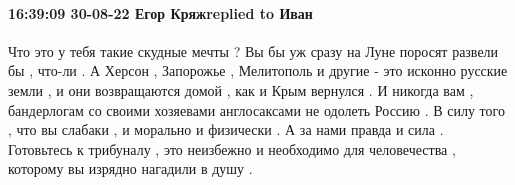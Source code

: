  
 
 
 
 

\paragraph{16:39:09 30-08-22 Егор Кряжreplied to Иван}

Что это у тебя такие скудные мечты ? Вы бы уж сразу на Луне поросят развели бы
, что-ли . А Херсон , Запорожье , Мелитополь и другие - это исконно русские
земли , и они возвращаются домой , как и Крым вернулся . И никогда вам ,
бандерлогам со своими хозяевами англосаксами не одолеть Россию . В силу того ,
что вы слабаки , и морально и физически . А за нами правда и сила . Готовьтесь
к трибуналу , это неизбежно и необходимо для человечества , которому вы изрядно
нагадили в душу .
